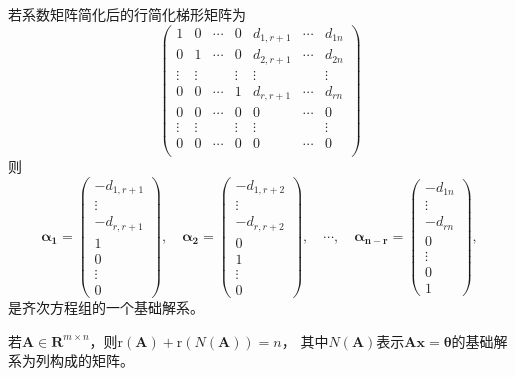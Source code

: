 \begin{remark}
    若系数矩阵简化后的行简化梯形矩阵为
    $$\left(\begin{array}{ccccccc}
        1 & 0 & \cdots & 0 & d_{1,r+1} & \cdots & d_{1n} \\
        0 & 1 & \cdots & 0 & d_{2,r+1} & \cdots & d_{2n} \\
        \vdots & \vdots &  & \vdots & \vdots &  & \vdots \\
        0 & 0 & \cdots & 1 & d_{r,r+1} & \cdots & d_{rn} \\
        0 & 0 & \cdots & 0 & 0 & \cdots & 0 \\
        \vdots & \vdots &  & \vdots & \vdots &  & \vdots \\
        0 & 0 & \cdots & 0 & 0 & \cdots & 0 \\
    \end{array}\right)$$
    则
    $$\boldsymbol{\alpha_1}=\left(\begin{array}{c}
        -d_{1,r+1}\\
        \vdots\\
        -d_{r,r+1}\\
        1\\
        0\\
        \vdots\\
        0
    \end{array}\right),\quad
    \boldsymbol{\alpha_2}=\left(\begin{array}{c}
        -d_{1,r+2}\\
        \vdots\\
        -d_{r,r+2}\\
        0\\
        1\\
        \vdots\\
        0
    \end{array}\right),\quad
    \cdots,\quad
    \boldsymbol{\alpha_{n-r}}=\left(\begin{array}{c}
        -d_{1n}\\
        \vdots\\
        -d_{rn}\\
        0\\
        \vdots\\
        0\\
        1
    \end{array}\right),$$
    是齐次方程组的一个基础解系。
\end{remark}

\begin{theorem}
    若$\boldsymbol{A}\in \mathbf{R}^{m\times n}$，则$\mathrm{r}(\boldsymbol{A})+\mathrm{r}(N(\boldsymbol{A}))=n$，
    其中$N(\boldsymbol{A})$表示$\boldsymbol{A}\boldsymbol{x}=\boldsymbol{\theta}$的基础解系为列构成的矩阵。
\end{theorem}

